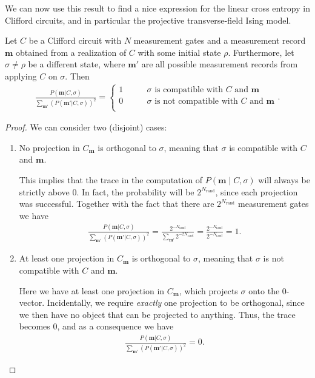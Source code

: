 We can now use this result to find a nice expression for the linear cross
entropy in Clifford circuits, and in particular the projective transverse-field
Ising model.
\begin{thm}\label{thm:lxe-cliff}
  Let $C$ be a Clifford circuit with $N$ measurement gates and a measurement
  record $\mathbf{m}$ obtained from a realization of $C$ with some initial
  state $\rho$. Furthermore, let
  $\sigma \neq \rho$ be a different state, where $\mathbf{m}'$ are all possible
  measurement records from applying $C$ on $\sigma$. Then
  \begin{align}\label{eq:diesesding}
      \frac{P(\mathbf{m} |
      C,\sigma)}{\sum_{\mathbf{m'}}\left(P(\mathbf{m}'|C,\sigma)\right)^2}
      = \begin{cases}
        1 & \qquad{\sigma\text{ is compatible with }C \text{ and }
        \mathbf{m}}\\
        0 & \qquad{\sigma\text{ is not compatible with }C \text{ and }
        \mathbf{m}}\\
      \end{cases}
  .\end{align}
\end{thm}

\begin{proof}
  We can consider two (disjoint) cases:
  \begin{enumerate}
    \item No projection in $C_\mathbf{m}$ is orthogonal to $\sigma$, meaning
      that $\sigma$ is compatible with $C$ and $\mathbf{m}$.

      This implies that the trace in the computation of $P\left(\mathbf{m} \mid
      C,\sigma\right)$ will always be strictly above $0$. In fact, the
      probability will be $2^{N_\mathrm{rand}}$, since each projection was
      successful. Together with the fact that there are $2^{N_\mathrm{rand}}$
      measurement gates we have
      \begin{align}
      \frac{P(\mathbf{m} |
      C,\sigma)}{\sum_{\mathbf{m'}}\left(P(\mathbf{m}'|C,\sigma)\right)^2} =
      \frac{2^{-N_\mathrm{rand}}}{\sum_{\mathbf{m}'} 2^{-2N_\mathrm{rand}}}
      = \frac{2^{-N_\mathrm{rand}}}{2^{-N_\mathrm{rand}}} = 1
      .\end{align}

    \item At least one projection in $C_\mathbf{m}$ is orthogonal to $\sigma$,
      meaning that $\sigma$ is not compatible with $C$ and $\mathbf{m}$.

      Here we have at least one projection in $C_\mathbf{m}$, which projects
      $\sigma$ onto the $0$-vector. Incidentally, we require \emph{exactly} one
      projection to be orthogonal, since we then have no object that can be
      projected to anything. Thus, the trace becomes $0$, and as a consequence
      we have
      \begin{align}
      \frac{P(\mathbf{m} |
      C,\sigma)}{\sum_{\mathbf{m'}}\left(P(\mathbf{m}'|C,\sigma)\right)^2} = 0
      .\end{align}
  \end{enumerate}
\end{proof}

